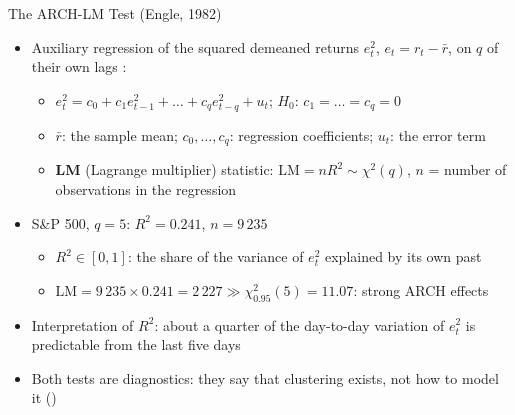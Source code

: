 \begin{frame}{The ARCH-LM Test (Engle, 1982)}
\itemsize{\small}
\begin{itemize}
    \item Auxiliary regression of the squared demeaned returns $e_t^2$, $e_t = r_t - \bar r$, on $q$ of their own lags :
    \begin{itemize}
        \item $e_t^2 = c_0 + c_1 e_{t-1}^2 + \dots + c_q e_{t-q}^2 + u_t$; $H_0$: $c_1 = \dots = c_q = 0$
        \item $\bar r$: the sample mean; $c_0, \dots, c_q$: regression coefficients; $u_t$: the error term
        \item \textbf{LM} (Lagrange multiplier) statistic: $\mathrm{LM} = n R^2 \sim \chi^2(q)$, $n$ = number of observations in the regression
    \end{itemize}
    \item S\&P 500, $q = 5$: $R^2 = 0.241$, $n = 9\,235$
    \begin{itemize}
        \item $R^2 \in [0, 1]$: the share of the variance of $e_t^2$ explained by its own past
        \item $\mathrm{LM} = 9\,235 \times 0.241 = 2\,227 \gg \chi^2_{0.95}(5) = 11.07$: strong ARCH effects
    \end{itemize}
    \item Interpretation of $R^2$: about a quarter of the day-to-day variation of $e_t^2$ is predictable from the last five days
    \item Both tests are diagnostics: they say that clustering exists, not how to model it ()
\end{itemize}
\end{frame}

